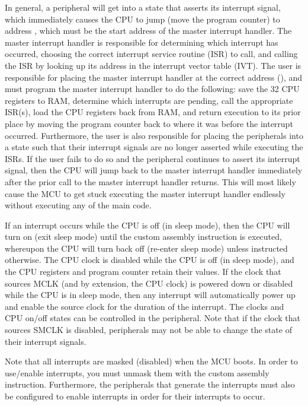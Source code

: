 \documentclass[11pt,pdftex,portrait,letterpaper]{article}
\begin{document}
In general, a peripheral will get into a state that asserts its interrupt signal, which immediately causes the CPU to jump (move the program counter) to address \ProgaddrIrq, which must be the start address of the master interrupt handler. The master interrupt handler is responsible for determining which interrupt has occurred, choosing the correct interrupt service routine (ISR) to call, and calling the ISR by looking up its address in the interrupt vector table (IVT). The user is responsible for placing the master interrupt handler at the correct address (\ProgaddrIrq), and must program the master interrupt handler to do the following: save the 32 CPU registers to RAM, determine which interrupts are pending, call the appropriate ISR(s), load the CPU registers back from RAM, and return execution to its prior place by moving the program counter back to where it was before the interrupt occurred. Furthermore, the user is also responsible for placing the peripherals into a state such that their interrupt signals are no longer asserted while executing the ISRs. If the user fails to do so and the peripheral continues to assert its interrupt signal, then the CPU will jump back to the master interrupt handler immediately after the prior call to the master interrupt handler returns. This will most likely cause the MCU to get stuck executing the master interrupt handler endlessly without executing any of the main code.

If an interrupt occurs while the CPU is off (in sleep mode), then the CPU will turn on (exit sleep mode) until the custom  assembly instruction is executed, whereupon the CPU will turn back off (re-enter sleep mode) unless instructed otherwise. The CPU clock is disabled while the CPU is off (in sleep mode), and the CPU registers and program counter retain their values. If the clock that sources MCLK (and by extension, the CPU clock) is powered down or disabled while the CPU is in sleep mode, then any interrupt will automatically power up and enable the source clock for the duration of the interrupt. The clocks and CPU on/off states can be controlled in the  peripheral. Note that if the clock that sources SMCLK is disabled, peripherals may not be able to change the state of their interrupt signals.

Note that all interrupts are masked (disabled) when the MCU boots. In order to use/enable interrupts, you must unmask them with the custom  assembly instruction. Furthermore, the peripherals that generate the interrupts must also be configured to enable interrupts in order for their interrupts to occur.
\end{document}
